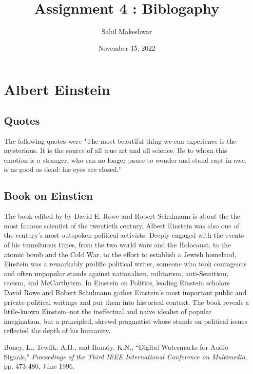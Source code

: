 \documentclass[12pt]{article}
\title{Assignment 4 : Biblogaphy}
\author{Sahil Makeshwar}
\date{November 15, 2022}
\begin{document}
\maketitle
\section{Albert Einstein}
 \subsection{Quotes}
 The following quotes were \cite{Boney96}
 "The most beautiful thing we can experience is the mysterious. It is the source of all true art and all science. He to whom this emotion is a stranger, who can no longer pause to wonder and stand rapt in awe, is as good as dead: his eyes are closed."

\subsection{Book on Einstien}
The book \cite{Boney96} edited by by David E. Rowe and Robert Schulmann is about the the most famous scientist of the twentieth century, Albert Einstein was also one of the century's most outspoken political activists. Deeply engaged with the events of his tumultuous times, from the two world wars and the Holocaust, to the atomic bomb and the Cold War, to the effort to establish a Jewish homeland, Einstein was a remarkably prolific political writer, someone who took courageous and often unpopular stands against nationalism, militarism, anti-Semitism, racism, and McCarthyism. In Einstein on Politics, leading Einstein scholars David Rowe and Robert Schulmann gather Einstein's most important public and private political writings and put them into historical context. The book reveals a little-known Einstein--not the ineffectual and naïve idealist of popular imagination, but a principled, shrewd pragmatist whose stands on political issues reflected the depth of his humanity.

\begin{thebibliography} {}
	
	 Boney, L., Tewfik, A.H., and Hamdy, K.N., ``Digital
	Watermarks for Audio Signals," \emph{Proceedings of the Third IEEE
		International Conference on Multimedia}, pp. 473-480, June 1996.
	
\end{thebibliography}
\end{document}
